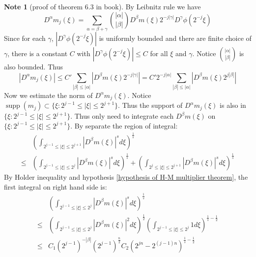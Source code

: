 \documentclass{report}
\theoremstyle{definition}
\newtheorem{note}{Note}
\theoremstyle{definition}
\theoremstyle{plain}
\numberwithin{theorem}{subsection}
\numberwithin{remark}{subsection}
\newcommand{\abs}[1]{\left\lvert#1\right\rvert}
\newcommand{\supp}{\operatorname{supp}}
\begin{document}
\begin{note}[proof of theorem 6.3 in book]
    By Leibnitz rule we have
    \begin{equation*}
        D^\alpha m_j(\xi)=\sum_{\alpha=\beta+\gamma}\binom{\abs{\alpha}}{\abs{\beta}} D^\beta m(\xi)2^{-j\abs{\gamma}}D^\gamma\phi(2^{-j}\xi)
    \end{equation*}
    Since for each $\gamma$, $\abs{D^\gamma\phi(2^{-j}\xi)}$ is uniformly bounded and there are finite choice of $\gamma$, there is a
    constant $C$ with $\abs{D^\gamma\phi(2^{-j}\xi)}\leq C$ for all $\xi$ and $\gamma$. Notice $\binom{\abs{\alpha}}{\abs{\beta}}$ is also bounded. Thus
    \begin{equation*}
        \abs{ D^\alpha m_j(\xi)}\leq C'\sum_{\abs{\beta}\leq \abs{\alpha}}\abs{D^\beta m(\xi)2^{-j\abs{\gamma}}}=C'2^{-j\abs{\alpha}}\sum_{\abs{\beta}\leq \abs{\alpha}}\abs{D^\beta m(\xi)2^{j\abs{\beta}}}
    \end{equation*}
    Now we estimate the norm of $D^\alpha m_j(\xi)$. Notice $\supp(m_j)\subset\{\xi:2^{j-1}\leq \abs{\xi}\leq 2^{j+1}\}$. Thus the support of $D^\alpha m_j(\xi)$ is also in $\{\xi:2^{j-1}\leq \abs{\xi}\leq 2^{j+1}\}$. Thus
    only need to integrate each $D^\beta m(\xi)$ on $\{\xi:2^{j-1}\leq \abs{\xi}\leq 2^{j+1}\}$. By separate the region of integral:
    \begin{align*}
             & (\int_{2^{j-1}\leq \abs{\xi}\leq 2^{j+1}}\abs{D^\beta m(\xi)}^s d\xi)^{\frac{1}{s}}                                                                                   \\
        \leq & (\int_{2^{j-1}\leq \abs{\xi}\leq 2^{j}}\abs{D^\beta m(\xi)}^s d\xi)^{\frac{1}{s}}+  (\int_{2^{j}\leq \abs{\xi}\leq 2^{j+1}}\abs{D^\beta m(\xi)}^s d\xi)^{\frac{1}{s}}
    \end{align*}
    By Holder inequality and hypothesis \eqref{hypothesis of H-M multiplier theorem}, the first integral on right hand side is:
    \begin{align*}
             & (\int_{2^{j-1}\leq \abs{\xi}\leq 2^{j}}\abs{D^\beta m(\xi)}^s d\xi)^{\frac{1}{s}}                                                                          \\
        \leq & (\int_{2^{j-1}\leq \abs{\xi}\leq 2^{j}}\abs{D^\beta m(\xi)}^2 d\xi)^{\frac{1}{2}}(\int_{2^{j-1}\leq \abs{\xi}\leq 2^{j}} 1 d\xi)^{\frac{1}{s}-\frac{1}{2}} \\
        \leq & C_1 (2^{j-1})^{-\abs{\beta}}(2^{j-1})^\frac{n}{2} C_2(2^{j n}-2^{(j-1)n})^{\frac{1}{s}-\frac{1}{2}}                                                        \\

\end{align*}
\end{note}
\end{document}
